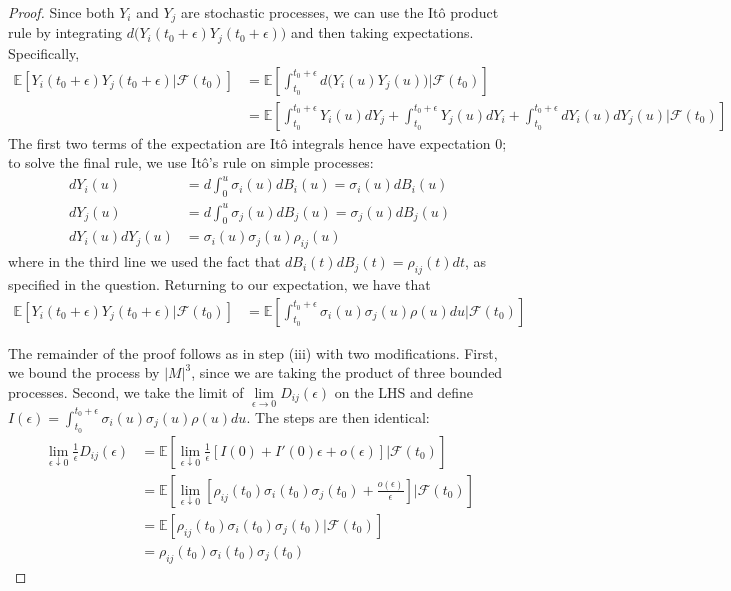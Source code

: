 \documentclass{article}
\newcommand{\E}{\mathbb{E}}
\newcommand{\F}{\mathcal{F}}
\newcommand{\eps}{\epsilon}
\newcommand{\abs}[1]{\left| #1 \right|}
\newcommand{\limit}[1]{\underset{#1}{\lim}}
\theoremstyle{definition}
\theoremstyle{definition}
\begin{document}
\begin{enumerate}
\begin{enumerate}[(i)]
\begin{proof}
    Since both $Y_i$ and $Y_j$ are stochastic processes, we can use the It\^{o} product rule by integrating $d\big(Y_{i}(t_0+\eps)Y_j(t_0+\eps)\big)$ and then taking expectations. Specifically,
    \begin{align*}
      \E\left[Y_i(t_0+\eps)Y_j(t_0+\eps)  \big|\F(t_0)  \right] &= \E\left[ \int_{t_0}^{t_0+\eps}  d\big(Y_{i}(u)Y_j(u)\big) | \F(t_0) \right] \\
      &= \E\left[ \int_{t_0}^{t_0+\eps} Y_i(u) dY_j +\int_{t_0}^{t_0+\eps}Y_j(u)dY_i + \int_{t_0}^{t_0+\eps}dY_i(u)dY_j(u)  \bigg| \F(t_0) \right]
    \end{align*}
    The first two terms of the expectation are It\^{o} integrals hence have expectation $0$; to solve the final rule, we use It\^{o}'s rule on simple processes:
    \begin{align*}
        dY_i(u) &= d \int_{0}^{u} \sigma_i(u)dB_i(u) = \sigma_i(u) dB_i(u) \\
        dY_j(u) &= d \int_{0}^{u} \sigma_j(u)dB_j(u) = \sigma_j(u) dB_j(u)  \\
        dY_i(u)dY_j(u) & = \sigma_i(u)\sigma_j(u) \rho_{ij}(u)
    \end{align*} 
    where in the third line we used the fact that $dB_i(t)dB_j(t)=\rho_{ij}(t)dt$, as specified in the question. Returning to our expectation, we have that
    \begin{align*}
        \E\left[Y_i(t_0+\eps)Y_j(t_0+\eps)  \big|\F(t_0)  \right] &= \E\left[ \int_{t_0}^{t_0+\eps} \sigma_i(u)\sigma_j(u) \rho(u)du \big| \F(t_0)\right]
    \end{align*}
     
    The remainder of the proof follows as in step (iii) with two modifications. First, we bound the process by $\abs{M}^3$, since we are taking the product of three bounded processes. Second, we take the limit of $\limit{\eps \to 0} D_{ij}(\eps)$ on the LHS and define $I(\eps) = \int_{t_0}^{t_0+\eps}\sigma_i(u)\sigma_j(u) \rho(u)du$. The steps are then identical:
         \begin{align*}
        \limit{\eps \downarrow 0} \frac{1}{\eps} D_{ij}(\eps) 
        &= \E\left[ \limit{\eps \downarrow 0}\frac{1}{\eps}  \left[ I(0) + I'(0) \eps + o(\eps)  \right] \bigg| \F(t_0)  \right] \\
        &= \E\left[\limit{\eps \downarrow 0}  \left[  \rho_{ij}(t_0)\sigma_i(t_0)\sigma_j(t_0) + \frac{o(\eps)}{\eps} \right] \bigg|\F(t_0) \right] \\
        &= \E\left[ \rho_{ij}(t_0)\sigma_i(t_0)\sigma_j(t_0)  \big|\F(t_0)\right] \\
        &= \rho_{ij}(t_0)\sigma_i(t_0)\sigma_j(t_0)
    \end{align*}
    

\end{proof}
\end{enumerate}
\end{enumerate}
\end{document}
